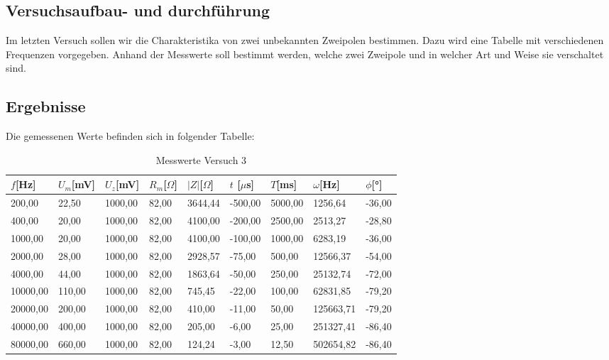     \subsection{Versuchsaufbau- und durchführung}

        Im letzten Versuch sollen wir die Charakteristika von zwei unbekannten Zweipolen bestimmen. Dazu wird eine Tabelle mit verschiedenen Frequenzen vorgegeben. Anhand der Messwerte soll bestimmt werden, welche zwei Zweipole und in welcher Art und Weise sie verschaltet sind.

    \subsection{Ergebnisse}
    
        Die gemessenen Werte befinden sich in folgender Tabelle:

        \begin{table}[H]
            \centering
            \caption{Messwerte Versuch 3}
            \vspace{0.5em}
            \begin{tabular}{|l||l|l|l|l|l|l|l|l|}
                \hline
                $f$[Hz] & $U_m$[mV]  & $U_z$[mV] & $R_{m}$[$\Omega$] & $|Z|$[$\Omega$] & $t$ [$\mu$s] & $T$[ms] & $\omega$[Hz] & $\phi$[°] \\
                \hline
                \hline
                200,00   & 22,50  & 1000,00 & 82,00 & 3644,44 & -500,00 & 5000,00 & 1256,64   & -36,00 \\
                \hline
                400,00   & 20,00  & 1000,00 & 82,00 & 4100,00 & -200,00 & 2500,00 & 2513,27   & -28,80 \\
                \hline
                1000,00  & 20,00  & 1000,00 & 82,00 & 4100,00 & -100,00 & 1000,00 & 6283,19   & -36,00 \\
                \hline
                2000,00  & 28,00  & 1000,00 & 82,00 & 2928,57 & -75,00  & 500,00  & 12566,37  & -54,00 \\
                \hline
                4000,00  & 44,00  & 1000,00 & 82,00 & 1863,64 & -50,00  & 250,00  & 25132,74  & -72,00 \\
                \hline
                10000,00 & 110,00 & 1000,00 & 82,00 & 745,45  & -22,00  & 100,00  & 62831,85  & -79,20 \\
                \hline
                20000,00 & 200,00 & 1000,00 & 82,00 & 410,00  & -11,00  & 50,00   & 125663,71 & -79,20 \\
                \hline
                40000,00 & 400,00 & 1000,00 & 82,00 & 205,00  & -6,00   & 25,00   & 251327,41 & -86,40 \\
                \hline
                80000,00 & 660,00 & 1000,00 & 82,00 & 124,24  & -3,00   & 12,50   & 502654,82 & -86,40\\
                \hline
            \end{tabular}
            \label{tab:Versuch3_Messwerte}
        \end{table}

